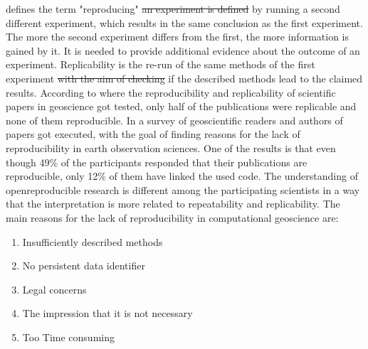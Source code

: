 \documentclass[draft,final]{vutinfth} %
\providecommand{\DIFaddtex}[1]{{\protect\color{blue}\uwave{#1}}} %
\providecommand{\DIFdeltex}[1]{{\protect\color{red}\sout{#1}}}                      %
\providecommand{\DIFaddbegin}{} %
\providecommand{\DIFaddend}{} %
\providecommand{\DIFdelbegin}{} %
\providecommand{\DIFdelend}{} %
\providecommand{\DIFadd}[1]{\texorpdfstring{\DIFaddtex{#1}}{#1}} %
\providecommand{\DIFdel}[1]{\texorpdfstring{\DIFdeltex{#1}}{}} %
\begin{document}
{defines the term }\DIFaddend "reproducing" \DIFdelbegin \DIFdel{an experiment is defined }\DIFdelend by running a second different experiment, which results in the same conclusion as the first experiment. The more the second experiment differs from the first, the more information is gained by it. It is needed to provide additional evidence about the outcome of an experiment. Replicability is the re-run of the same methods of the first experiment \DIFdelbegin \DIFdel{with the aim of checking }\DIFdelend \DIFaddbegin \DIFadd{to check }\DIFaddend if the described methods lead to the claimed results\cite{reprovsrepli}. According to \cite{Ostermann2017AdvancingSW} where the reproducibility and replicability of scientific papers in geoscience got tested, only half of the publications were replicable and none of them reproducible. In \cite{Thestateofreproducibility} a survey of geoscientific readers and authors of papers got executed, with the goal of finding reasons for the lack of reproducibility in earth observation sciences. One of the results is that even though 49\% of the participants responded that their publications are reproducible, only 12\% of them have linked the used code. The understanding of open\DIFaddbegin \DIFadd{, }\DIFaddend reproducible research is different among the participating scientists in a way that the interpretation is more related to repeatability and replicability. The main reasons for the lack of reproducibility in computational geoscience are:

\begin{enumerate}
	\item Insufficiently described methods 
	\item No persistent data identifier
	\item Legal concerns
	\item The impression that it is not necessary
	\item Too Time consuming
\end{enumerate} 
\end{document}
